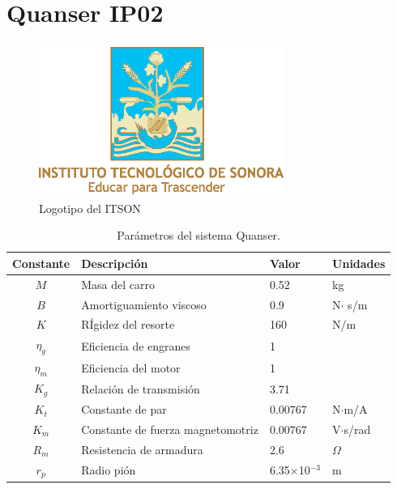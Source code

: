 \chapter{Quanser IP02} \label{apx:quanser}

\begin{figure}
\centering
\includegraphics[width=8cm,height=5cm]{./figs/logoclr}
\caption{Logotipo del ITSON}
\end{figure}


\begin{table}
\centering
\begin{tabular}{clll}
\hline
Constante & Descripción & Valor & Unidades \\
\hline
$M$ & Masa del carro & 0.52 & kg \\
$B$ & Amortiguamiento viscoso & 0.9 & N$\cdot$ s/m \\
$K$ & RÍgidez del resorte & 160 & N/m \\
$\eta_g$ & Eficiencia de engranes & 1 & \\
$\eta_m$ & Eficiencia del motor & 1 & \\
$K_g$ & Relación de transmisión & 3.71 &  \\
$K_t$ & Constante de par & 0.00767 & N$\cdot$m/A \\
$K_m$ & Constante de fuerza magnetomotriz & 0.00767 & V$\cdot$s/rad \\ 
$R_m$ & Resistencia de armadura & 2.6 & $\Omega$ \\
$r_p$ & Radio pión & 6.35$\times$10$^{-3}$ & m \\
\hline
\end{tabular}
\caption{Parámetros del sistema Quanser. \label{tab:parametros}}
\end{table}